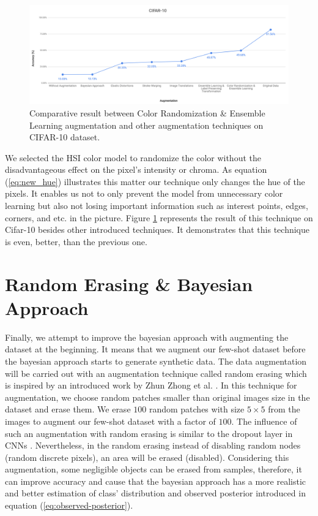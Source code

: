 \begin{figure}
  \centering
  \label{fig:cifar_10_random_color_result}
  \includegraphics[width=1\textwidth]{fig/contribution/cifar-10-random-color-result}
  \caption{Comparative result between Color Randomization \& Ensemble Learning augmentation and other augmentation techniques on CIFAR-10 dataset.}
\end{figure}

We selected the HSI color model to randomize the color without the disadvantageous effect on the
pixel's intensity or chroma. As equation (\ref{eq:new_hue}) illustrates this matter our
technique only changes the hue of the pixels. It enables us not to only prevent the model from
unnecessary color learning but also not losing important information such as interest points,
edges, corners, and etc. in the picture. Figure \ref{fig:cifar_10_random_color_result} represents the result
of this technique on Cifar-10 besides other introduced techniques. It demonstrates that this
technique is even, better, than the previous one.


\section{Random Erasing \& Bayesian Approach}
Finally, we attempt to improve the bayesian approach with augmenting the
dataset at the beginning. It means that we augment our few-shot dataset before the bayesian approach
starts to generate synthetic data. The data augmentation will be carried out with an augmentation
technique called random erasing which is inspired by an introduced work by Zhun Zhong et al.
\cite{random_erasing}. In this technique for augmentation, we choose random patches smaller than
original images size in the dataset and erase them. We erase $100$ random patches with size $5
  \times 5$ from the images to augment our few-shot dataset with a factor of $100$. The influence of
such an augmentation with random erasing is similar to the dropout layer in CNNs \cite{dropout_book}.
Nevertheless, in the random erasing instead of disabling random nodes (random discrete pixels), an
area will be erased (disabled). Considering this augmentation, some negligible objects can be erased
from samples, therefore, it can improve accuracy and cause that the bayesian approach has a more
realistic and better estimation of class' distribution and observed posterior introduced in
equation (\ref{eq:observed-posterior}).

